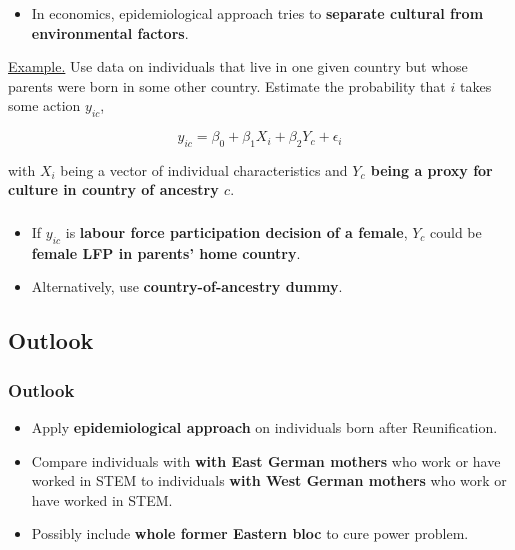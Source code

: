 \documentclass[11pt, aspectratio=1610, xcolor={dvipsnames}]{beamer}
\newcommand{\highlight}[1]{\textbf{\textcolor{PineGreen}{#1}}}
\begin{document}
	\begin{frame}
		\frametitle{}
		
		\begin{itemize}
			\item In economics, epidemiological approach tries to \highlight{separate cultural from environmental factors}.
		\end{itemize}
		
		\vspace{8mm}
		
		\begin{minipage}{\linewidth}
			\textcolor{PineGreen}{\underline{Example.}} Use data on individuals that live in one given country but whose parents were born in some other country. Estimate the probability that $i$ takes some action $y_{ic}$,
			
			\vspace{-4mm}
			
			\begin{equation}
				\label{eq:fernandez}
				y_{ic} = \beta_{0} + \beta_{1}X_{i} + \beta_{2}Y_{c} + \epsilon_{i}
			\end{equation}
			
			with $X_{i}$ being a vector of individual characteristics and \highlight{$Y_{c}$ being a proxy for culture in country of ancestry $c$}.
			
		\end{minipage}
		
	\end{frame}
	
	\begin{frame}
		\frametitle{}
		
		\begin{itemize}
			\item If $y_{ic}$ is \highlight{labour force participation decision of a female}, $Y_{c}$ could be \highlight{female LFP in parents' home country}.
			\item Alternatively, use \highlight{country-of-ancestry dummy}.
		\end{itemize}
		
	\end{frame}
	
	\subsection{Outlook}
	\begin{frame}
		\frametitle{Outlook}
		
		\begin{itemize}
			\item Apply \highlight{epidemiological approach} on individuals born after Reunification.
			\item Compare individuals with \highlight{with East German mothers} who work or have worked in STEM to individuals \highlight{with West German mothers} who work or have worked in STEM.
			\item Possibly include \highlight{whole former Eastern bloc} to cure power problem.
		\end{itemize}
		
	\end{frame}
		
\end{document}
